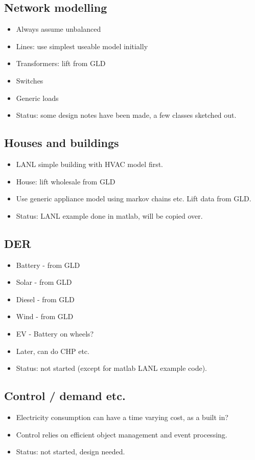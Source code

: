 \documentclass[12pt]{article}
\newcommand{\itm}[1]{\begin{itemize}#1\end{itemize}}
\begin{document}
\subsection{Network modelling}
\itm{
	\item Always assume unbalanced
	\item Lines: use simplest useable model initially
	\item Transformers: lift from GLD
	\item Switches
	\item Generic loads
	\item Status: some design notes have been made, a few classes sketched out.
}

\subsection{Houses and buildings}
\itm{
	\item LANL simple building with HVAC model first.
	\item House: lift wholesale from GLD
	\item Use generic appliance model using markov chains etc. Lift data from GLD.
	\item Status: LANL example done in matlab, will be copied over.
}
\subsection{DER}
\itm{
	\item Battery - from GLD
	\item Solar - from GLD
	\item Diesel - from GLD
	\item Wind - from GLD
	\item EV - Battery on wheels?
	\item Later, can do CHP etc.
	\item Status: not started (except for matlab LANL example code).
}

\subsection{Control / demand etc.}
\itm{
	\item Electricity consumption can have a time varying cost, as a built in?
	\item Control relies on efficient object management and event processing.
	\item Status: not started, design needed.
}
\newpage
\end{document}
